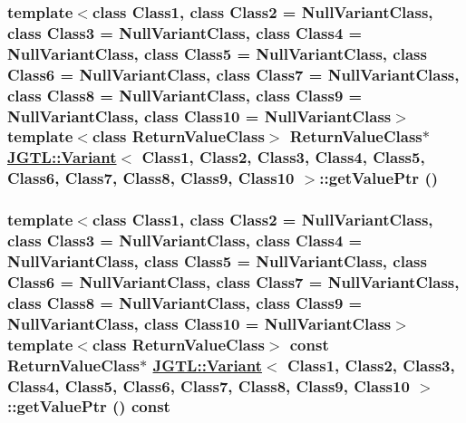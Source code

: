 \hypertarget{class_j_g_t_l_1_1_variant_e54d779f27e151cc64ccaeef995707e1}{
\subsubsection[getValuePtr]{\setlength{\rightskip}{0pt plus 5cm}template$<$class Class1, class Class2 = Null\-Variant\-Class, class Class3 = Null\-Variant\-Class, class Class4 = Null\-Variant\-Class, class Class5 = Null\-Variant\-Class, class Class6 = Null\-Variant\-Class, class Class7 = Null\-Variant\-Class, class Class8 = Null\-Variant\-Class, class Class9 = Null\-Variant\-Class, class Class10 = Null\-Variant\-Class$>$ template$<$class Return\-Value\-Class$>$ Return\-Value\-Class$\ast$ \hyperlink{class_j_g_t_l_1_1_variant}{JGTL::Variant}$<$ Class1, Class2, Class3, Class4, Class5, Class6, Class7, Class8, Class9, Class10 $>$::get\-Value\-Ptr ()}}
\label{class_j_g_t_l_1_1_variant_e54d779f27e151cc64ccaeef995707e1}


\hypertarget{class_j_g_t_l_1_1_variant_2950e4b7623f5a22640f75359248f999}{
\subsubsection[getValuePtr]{\setlength{\rightskip}{0pt plus 5cm}template$<$class Class1, class Class2 = Null\-Variant\-Class, class Class3 = Null\-Variant\-Class, class Class4 = Null\-Variant\-Class, class Class5 = Null\-Variant\-Class, class Class6 = Null\-Variant\-Class, class Class7 = Null\-Variant\-Class, class Class8 = Null\-Variant\-Class, class Class9 = Null\-Variant\-Class, class Class10 = Null\-Variant\-Class$>$ template$<$class Return\-Value\-Class$>$ const Return\-Value\-Class$\ast$ \hyperlink{class_j_g_t_l_1_1_variant}{JGTL::Variant}$<$ Class1, Class2, Class3, Class4, Class5, Class6, Class7, Class8, Class9, Class10 $>$::get\-Value\-Ptr () const}}
\label{class_j_g_t_l_1_1_variant_2950e4b7623f5a22640f75359248f999}


